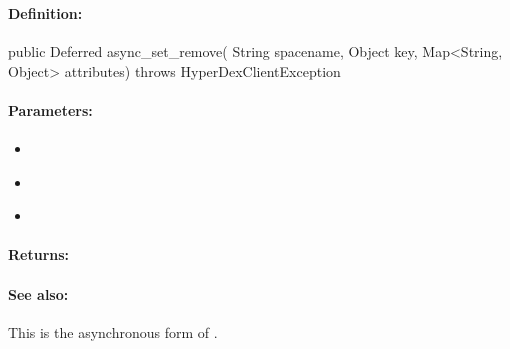 \pagebreak
\subsubsection{}
\label{api:java:async_set_remove}


\paragraph{Definition:}
\begin{javacode}
public Deferred async_set_remove(
        String spacename,
        Object key,
        Map<String, Object> attributes) throws HyperDexClientException
\end{javacode}

\paragraph{Parameters:}
\begin{itemize}[noitemsep]
\item {}\\

\item {}\\

\item {}\\

\end{itemize}

\paragraph{Returns:}


\paragraph{See also:}  This is the asynchronous form of .

\pagebreak
\subsubsection{}
\label{api:java:cond_set_remove}


